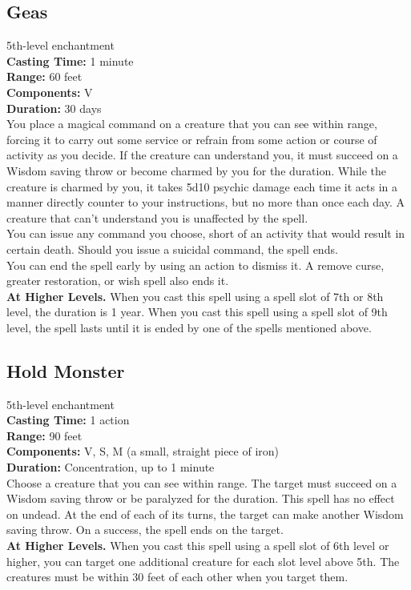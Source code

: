 \documentclass[11pt, A4paper, english]{article}
\begin{document}
		\subsection{Geas}
5th-level enchantment \\
\textbf{Casting Time:} 1 minute \\
\textbf{Range:} 60 feet \\
\textbf{Components:} V \\
\textbf{Duration:} 30 days \\
You place a magical command on a creature that you can see within range, forcing it to carry out some service or refrain from some action or course of activity as you decide. If the creature can understand you, it must succeed on a Wisdom  saving throw or become charmed by you for the duration. While the creature is charmed by you, it takes 5d10 psychic damage each time it acts in a manner directly counter to your instructions, but no more than once each day. A creature that can't understand you is unaffected by the spell. \\
You can issue any command you choose, short of an activity that would result in certain death. Should you issue a suicidal command, the spell ends. \\
You can end the spell early by using an action to dismiss it. A remove curse, greater restoration, or wish spell also ends it. \\
\textbf{At Higher Levels.} When you cast this spell using a spell slot of 7th or 8th level, the duration is 1 year. When you cast this spell using a spell slot of 9th level, the spell lasts until it is ended by one of the spells mentioned above.

		\subsection{Hold Monster}
5th-level enchantment \\
\textbf{Casting Time:} 1 action \\
\textbf{Range:} 90 feet \\
\textbf{Components:} V, S, M (a small, straight piece of iron) \\
\textbf{Duration:} Concentration, up to 1 minute \\
Choose a creature that you can see within range. The target must succeed on a Wisdom saving throw or be paralyzed for the duration. This spell has no effect on undead. At the end of each of its turns, the target can make another Wisdom  saving throw. On a success, the spell ends on the target. \\
\textbf{At Higher Levels.} When you cast this spell using a spell slot of 6th level or higher, you can target one additional creature for each slot level above 5th. The creatures must be within 30 feet of each other when you target them.
\end{document}
